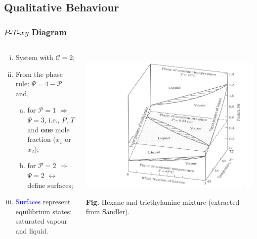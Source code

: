 \documentclass[10pt,compress,handout,ignorenonframetext,unknownkeysallowed]{beamer}
\begin{document}
\subsection{Qualitative Behaviour}
\begin{frame}
  \frametitle{$P$-$T$-$xy$ Diagram}
  \begin{columns}
     \begin{column}[l]{0.35\linewidth}
        \begin{enumerate}[i)]
            \item<1-> System with $\mathcal{C} =2$;
            \item<2-> From the phase rule: $\Psi = 4 -\mathcal{P}$ and,
                \begin{enumerate}[a)]
                    \item<3-> for $\mathcal{P}=1$ $\Longrightarrow$ $\Psi=3$, i.e., $P$, $T$ and {\bf one} mole fraction (\ie $x_{1}$ or $x_{2}$);
                    \item<4-> for $\mathcal{P}=2$ $\Longrightarrow$ $\Psi=2$ $\leftrightarrow$ define surfaces;
                \end{enumerate}
            \item<5-> \textcolor{blue}{Surfaces} represent equilibrium states: saturated vapour and liquid.
        \end{enumerate}
     \end{column}
     \begin{column}[l]{0.65\linewidth}
       \hbox{
          \hspace{-.9cm}\includegraphics[width=9.cm,clip]{./../Pics/PTxy_diagram}}
       \begin{center}
            \tiny{{\bf Fig.} Hexane and triethylamine mixture (extracted from Sandler).}
            \end{center}
     \end{column} 
  \end{columns}
\end{frame}
\normalsize
\end{document}
